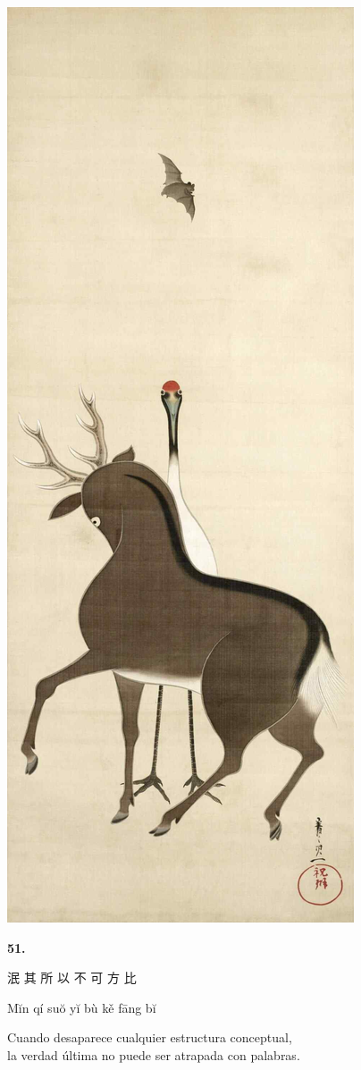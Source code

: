\documentclass[
  a5paperpaper,
]{article}
\begin{document}
\hypertarget{01}{}
\includegraphics{../img/image11.jpg}

\begin{verseblock}

\newpage

\begin{center}\textbf{51.}\end{center}

泯 其 所 以 不 可 方 比

Mĭn qí suŏ yĭ bù kě fāng bĭ

Cuando desaparece cualquier estructura conceptual,\\
la verdad última no puede ser atrapada con palabras.

\end{verseblock}
\end{document}
